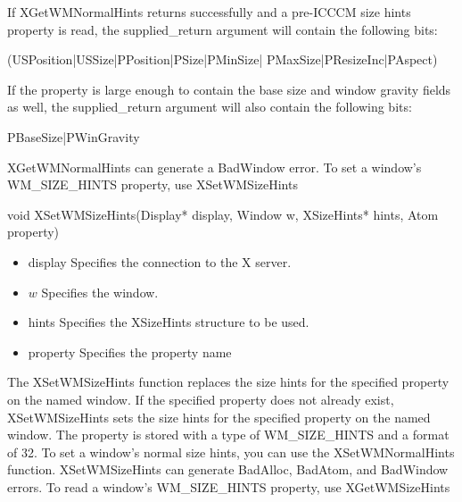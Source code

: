 \documentclass{report}
\begin{document}
\begin{itemize}
\begin{itemize}
            \bigbreak \noindent 
            If XGetWMNormalHints returns successfully and a pre-ICCCM size hints property is read, the supplied\_return argument will contain the following bits:
            \bigbreak \noindent 
            \begin{cppcode}
                (USPosition|USSize|PPosition|PSize|PMinSize| PMaxSize|PResizeInc|PAspect)
            \end{cppcode}
            \bigbreak \noindent 
            If the property is large enough to contain the base size and window gravity fields as well, the supplied\_return argument will also contain the following bits:
            \bigbreak \noindent 
            \begin{cppcode}
            PBaseSize|PWinGravity
            \end{cppcode}
            \bigbreak \noindent 
            XGetWMNormalHints can generate a BadWindow error.
            \bigbreak \noindent 
            To set a window’s WM\_SIZE\_HINTS property, use XSetWMSizeHints
            \bigbreak \noindent 
            \begin{cppcode}
            void XSetWMSizeHints(Display* display, Window w, XSizeHints* hints, Atom property)
            \end{cppcode}
            \bigbreak \noindent
            \begin{itemize}
                \item display Specifies the connection to the X server.
                \item $w$ Specifies the window.
                \item hints Specifies the XSizeHints structure to be used.
                \item property Specifies the property name
            \end{itemize}
            The XSetWMSizeHints function replaces the size hints for the specified property on the named window. If the specified property does not already exist, XSetWMSizeHints sets the size hints for the specified property on the named window. The property is stored with a type of WM\_SIZE\_HINTS and a format of 32. To set a window’s normal size hints, you can use the XSetWMNormalHints function.
            \bigbreak \noindent 
            XSetWMSizeHints can generate BadAlloc, BadAtom, and BadWindow errors.
            \bigbreak \noindent 
            To read a window’s WM\_SIZE\_HINTS property, use XGetWMSizeHints
            \bigbreak \noindent 
            \begin{cppcode}

\end{cppcode}
\end{itemize}
\end{itemize}
\end{document}
